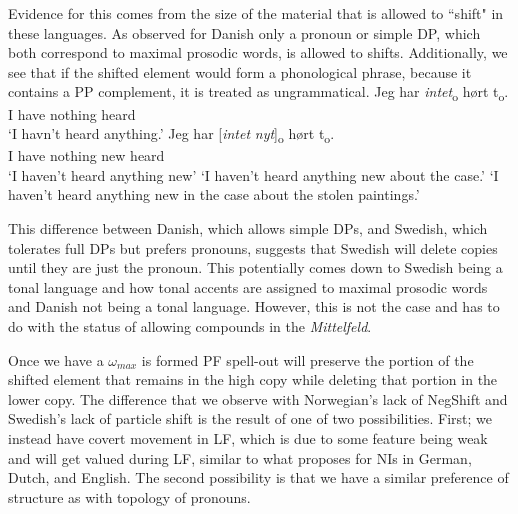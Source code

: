 \documentclass[12pt, letterpaper]{article}
\begin{document}
Evidence for this comes from the size of the material that is allowed to ``shift" in these languages. As observed for Danish only a pronoun or simple DP, which both correspond to maximal prosodic words, is allowed to shifts. Additionally, we see that if the shifted element would form a phonological phrase, because it contains a PP complement, it is treated as ungrammatical. 
\ea 
	\ea 
		\gll Jeg har \textit{intet}\textsubscript{o} hørt t\textsubscript{o}.\\
		I have nothing heard\\
		\glt  `I havn't heard anything.'
	\ex 
		\gll Jeg har [\textit{intet} \textit{nyt}]\textsubscript{o} hørt t\textsubscript{o}.\\
		I have nothing new heard\\
		\glt `I haven't heard anything new'
		\glt `I haven't heard anything new about the case.'
		\glt `I haven't heard anything new in the case about the stolen paintings.'
	\z  	
\z 

This difference between Danish, which allows simple DPs, and Swedish, which tolerates full DPs but prefers pronouns, suggests that Swedish will delete copies until they are just the pronoun. This potentially comes down to Swedish being a tonal language and how tonal accents are assigned to maximal prosodic words \citep{myrbergProsodicWordSwedish2013,myrbergProsodicHierarchySwedish2015,riadPhonologySwedish2014} and Danish not being a tonal language. However, this is not the case and has to do with the status of allowing compounds in the \emph{Mittelfeld}.

Once we have a $\omega_{max}$ is formed PF spell-out will preserve the portion of the shifted element that remains in the high copy while deleting that portion in the lower copy. The difference that we observe with Norwegian's lack of NegShift and Swedish's lack of particle shift is the result of one of two possibilities. First; we instead have covert movement in LF, which is due to some feature being weak and will get valued during LF, similar to what \citet{zeijlstraSyntacticallyComplexStatus2011} proposes for NIs in German, Dutch, and English. The second possibility is that we have a similar preference of structure as with  topology of pronouns.
\end{document}

